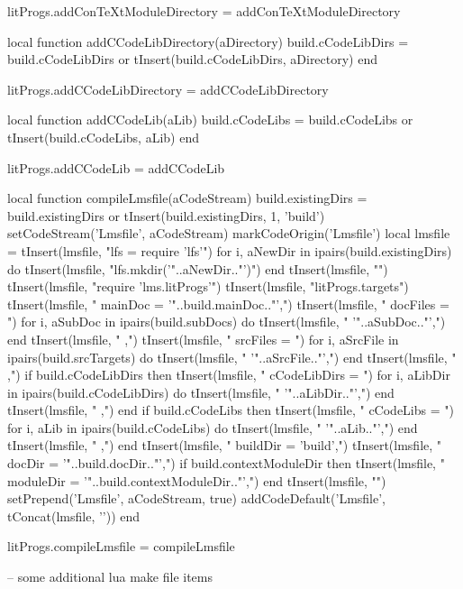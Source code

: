 litProgs.addConTeXtModuleDirectory = addConTeXtModuleDirectory

local function addCCodeLibDirectory(aDirectory)
  build.cCodeLibDirs = build.cCodeLibDirs or { }
  tInsert(build.cCodeLibDirs, aDirectory)
end

litProgs.addCCodeLibDirectory = addCCodeLibDirectory

local function addCCodeLib(aLib)
  build.cCodeLibs = build.cCodeLibs or { }
  tInsert(build.cCodeLibs, aLib)
end

litProgs.addCCodeLib = addCCodeLib
\stopLuaCode

\startMkIVCode
\def\compileLmsfile#1{
  \directlua{
    thirddata.literateProgs.compileLmsfile('#1')
  }
}
\stopMkIVCode

\startLuaCode
local function compileLmsfile(aCodeStream)
  build.existingDirs = build.existingDirs or { }
  tInsert(build.existingDirs, 1, 'build')
  setCodeStream('Lmsfile', aCodeStream)
  markCodeOrigin('Lmsfile')
  local lmsfile = {}
  tInsert(lmsfile, "lfs = require 'lfs'\n")
  for i, aNewDir in ipairs(build.existingDirs) do
    tInsert(lmsfile, "lfs.mkdir('"..aNewDir.."')")
  end
  tInsert(lmsfile, "")
  tInsert(lmsfile, "require 'lms.litProgs'\n")
  tInsert(lmsfile, "litProgs.targets{")
  tInsert(lmsfile, "  mainDoc  = '"..build.mainDoc.."',")
  tInsert(lmsfile, "  docFiles = {")
  for i, aSubDoc in ipairs(build.subDocs) do
    tInsert(lmsfile, "    '"..aSubDoc.."',")
  end
  tInsert(lmsfile, "  },")
  tInsert(lmsfile, "  srcFiles = {")
  for i, aSrcFile in ipairs(build.srcTargets) do
    tInsert(lmsfile, "    '"..aSrcFile.."',")
  end
  tInsert(lmsfile, "  },")
  if build.cCodeLibDirs then 
    tInsert(lmsfile, "  cCodeLibDirs = {")
    for i, aLibDir in ipairs(build.cCodeLibDirs) do
      tInsert(lmsfile, "    '"..aLibDir.."',")
    end
    tInsert(lmsfile, "  },")
  end
  if build.cCodeLibs then 
    tInsert(lmsfile, "  cCodeLibs = {")
    for i, aLib in ipairs(build.cCodeLibs) do
      tInsert(lmsfile, "    '"..aLib.."',")
    end
    tInsert(lmsfile, "  },")
  end
  tInsert(lmsfile, "  buildDir  = 'build',")
  tInsert(lmsfile, "  docDir    = '"..build.docDir.."',")
  if build.contextModuleDir then
    tInsert(lmsfile, "  moduleDir = '"..build.contextModuleDir.."',")
  end
  tInsert(lmsfile, "}")
  setPrepend('Lmsfile', aCodeStream, true)
  addCodeDefault('Lmsfile', tConcat(lmsfile, '\n'))
end

litProgs.compileLmsfile = compileLmsfile
\stopLuaCode

\startLmsfile
-- some additional lua make file items
\stopLmsfile

\stopchapter